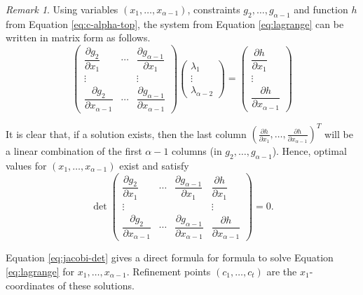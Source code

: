 \documentclass[
]{book}
\theoremstyle{definition}
\theoremstyle{definition}
\theoremstyle{definition}
\theoremstyle{definition}
\theoremstyle{remark}
\newtheorem*{remark}{Remark}
\begin{document}
\begin{remark}
Using variables \((x_1,\ldots,x_{\alpha-1})\), constraints \(g_2,\ldots,g_{\alpha - 1}\) and function \(h\) from Equation \eqref{eq:c-alpha-top}, the system from Equation \eqref{eq:lagrange} can be written in matrix form as follows.
\[
\begin{pmatrix}\dfrac{\partial g_{2}}{\partial x_{1}} & \cdots & \dfrac{\partial g_{\alpha-1}}{\partial x_{1}}\\
\vdots &  & \vdots\\
\dfrac{\partial g_{2}}{\partial x_{\alpha-1}} & \cdots & \dfrac{\partial g_{\alpha-1}}{\partial x_{\alpha-1}}
\end{pmatrix}\begin{pmatrix}\lambda_{1}\\
\vdots\\
\lambda_{\alpha-2}
\end{pmatrix}=\begin{pmatrix}\dfrac{\partial h}{\partial x_{1}}\\
\vdots\\
\dfrac{\partial h}{\partial x_{\alpha-1}}
\end{pmatrix}
\]

It is clear that, if a solution exists, then the last column
\(\left(\tfrac{\partial h}{\partial x_{1}},\ldots, \tfrac{\partial h}{\partial x_{\alpha-1}}\right)^T\)
will be a linear combination of the first \(\alpha - 1\) columns (in \(g_2,\ldots,g_{\alpha - 1}\)).
Hence, optimal values for \((x_1,\ldots,x_{\alpha-1})\) exist and satisfy
\begin{equation}
\det\begin{pmatrix}\dfrac{\partial g_{2}}{\partial x_{1}} & \cdots & \dfrac{\partial g_{\alpha-1}}{\partial x_{1}} & \dfrac{\partial h}{\partial x_{1}}\\
\vdots &  &  & \vdots\\
\dfrac{\partial g_{2}}{\partial x_{\alpha-1}} & \cdots & \dfrac{\partial g_{\alpha-1}}{\partial x_{\alpha-1}} & \dfrac{\partial h}{\partial x_{\alpha-1}}
\end{pmatrix}=0.
\label{eq:jacobi-det}
\end{equation}
\end{remark}

Equation \eqref{eq:jacobi-det} gives a direct formula for formula to solve Equation \eqref{eq:lagrange} for \(x_1,\ldots,x_{\alpha - 1}\). Refinement points \((c_1,\ldots,c_t)\) are the \(x_1\)-coordinates of these solutions.
\end{document}
